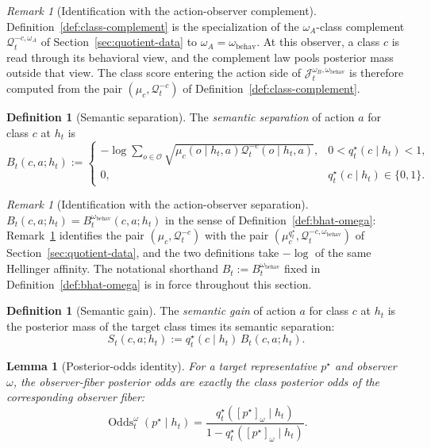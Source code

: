 \documentclass[11pt]{article}
\newtheorem{lemma}[theorem]{Lemma}
\theoremstyle{definition}
\newtheorem{definition}[theorem]{Definition}
\theoremstyle{remark}
\newtheorem{remark}[theorem]{Remark}
\theoremstyle{plain}
\theoremstyle{definition}
\newcommand{\Ocal}{\mathcal{O}}
\newcommand{\Qcal}{\mathcal{Q}}
\begin{document}
\begin{remark}[Identification with the action-observer complement]
\label{rem:class-complement-is-omega-behav}
Definition~\ref{def:class-complement} is the specialization of the $\omega_A$-class complement $\Qcal_t^{-c,\omega_A}$ of Section~\ref{sec:quotient-data} to $\omega_A=\omega_{\mathrm{behav}}$. At this observer, a class $c$ is read through its behavioral view, and the complement law pools posterior mass outside that view. The class score entering the action side of $\mathcal J_t^{\omega_B,\omega_{\mathrm{behav}}}$ is therefore computed from the pair $(\mu_c,\Qcal_t^{-c})$ of Definition~\ref{def:class-complement}.
\end{remark}

\begin{definition}[Semantic separation]
\label{def:semantic-separation}
The \emph{semantic separation} of action $a$ for class $c$ at $h_t$ is
\[
B_t(c,a;h_t)
:=
\begin{cases}
-\log\sum_{o\in\Ocal}\sqrt{\mu_c(o\mid h_t,a)\Qcal_t^{-c}(o\mid h_t,a)}, & 0<q_t^\star(c\mid h_t)<1,\\
0, & q_t^\star(c\mid h_t)\in\{0,1\}.
\end{cases}
\]
\end{definition}

\begin{remark}[Identification with the action-observer separation]
\label{rem:B-is-B-omega-behav}
$B_t(c,a;h_t)=B_t^{\omega_{\mathrm{behav}}}(c,a;h_t)$ in the sense of Definition~\ref{def:bhat-omega}: Remark~\ref{rem:class-complement-is-omega-behav} identifies the pair $(\mu_c,\Qcal_t^{-c})$ with the pair $(\mu_c^{q_t^\star},\Qcal_t^{-c,\omega_{\mathrm{behav}}})$ of Section~\ref{sec:quotient-data}, and the two definitions take $-\log$ of the same Hellinger affinity. The notational shorthand $B_t:=B_t^{\omega_{\mathrm{behav}}}$ fixed in Definition~\ref{def:bhat-omega} is in force throughout this section.
\end{remark}

\begin{definition}[Semantic gain]
\label{def:semantic-gain}
The \emph{semantic gain} of action $a$ for class $c$ at $h_t$ is the posterior mass of the target class times its semantic separation:
\[
S_t(c,a;h_t):=q_t^\star(c\mid h_t)\,B_t(c,a;h_t).
\]
\end{definition}

\begin{lemma}[Posterior-odds identity]
\label{lem:odds-identity}
For a target representative $p^\star$ and observer $\omega$, the observer-fiber posterior odds are exactly the class posterior odds of the corresponding observer fiber:
\[
\operatorname{Odds}_t^\omega(p^\star\mid h_t)
=
\frac{q_t^\star([p^\star]_\omega\mid h_t)}
{1-q_t^\star([p^\star]_\omega\mid h_t)}.
\]
\end{lemma}
\end{document}
